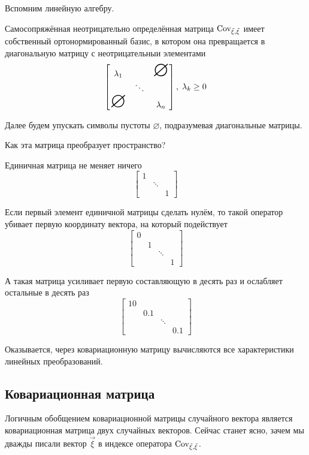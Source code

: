 \begin{remark}\label{remark:linearAlgebra:selfAdjointMatrix}
    Вспомним линейную алгебру.

    Самосопряжённая неотрицательно определённая матрица $\operatorname{Cov_{\vec{\xi}, \vec{\xi}}}$ имеет
    собственный ортонормированный базис, в котором она превращается в
    диагональную матрицу с неотрицательныи элементами
    $$\begin{bmatrix}
        \lambda_1 & & \mbox{\Huge{$\varnothing$}} \\
         & \ddots &  \\
         \mbox{\Huge{$\varnothing$}} & & \lambda_n
    \end{bmatrix},\; \lambda_k \ge 0$$

    Далее будем упускать символы пустоты $\varnothing$,
    подразумевая диагональные матрицы.

    Как эта матрица преобразует пространство?

    Единичная матрица не меняет ничего
    $$\begin{bmatrix}
        1 & &\\
        & \ddots & \\
        & & 1
    \end{bmatrix}$$

    Если первый элемент единичной матрицы сделать нулём, то такой оператор
    убивает первую координату вектора, на который подействует
    $$\begin{bmatrix}
        0 & & & \\
        & 1 & & \\
        & & \ddots & \\
        & & & 1
    \end{bmatrix}$$

    А такая матрица усиливает первую составляющую в десять раз и
    ослабляет остальные в десять раз
    $$\begin{bmatrix}
        10 & & &\\
        & 0.1 & & \\
        & & \ddots & \\
        & & & 0.1
    \end{bmatrix}$$

    Оказывается, через ковариационную матрицу вычисляются все характеристики
    линейных преобразований.
\end{remark}

\subsection{Ковариационная матрица}
Логичным обобщением ковариационной матрицы случайного вектора является
ковариационная матрица двух случайных векторов. Сейчас станет ясно, зачем мы
дважды писали вектор $\vec{\xi}$ в индексе оператора $\operatorname{Cov_{\vec{\xi}, \vec{\xi}}}$.


